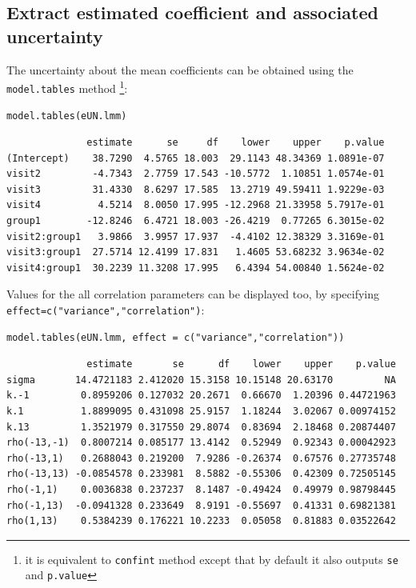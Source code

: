\documentclass[12pt]{article}
\begin{document}
\subsection{Extract estimated coefficient and associated uncertainty}
\label{sec:orged2e9f9}

The uncertainty about the mean coefficients can be obtained using the
\texttt{model.tables} method \footnote{it is equivalent to \texttt{confint} method
except that by default it also outputs \texttt{se} and \texttt{p.value}}:
\lstset{language=r,label= ,caption= ,captionpos=b,numbers=none}
\begin{lstlisting}
model.tables(eUN.lmm)
\end{lstlisting}

\begin{verbatim}
              estimate      se     df    lower    upper    p.value
(Intercept)    38.7290  4.5765 18.003  29.1143 48.34369 1.0891e-07
visit2         -4.7343  2.7759 17.543 -10.5772  1.10851 1.0574e-01
visit3         31.4330  8.6297 17.585  13.2719 49.59411 1.9229e-03
visit4          4.5214  8.0050 17.995 -12.2968 21.33958 5.7917e-01
group1        -12.8246  6.4721 18.003 -26.4219  0.77265 6.3015e-02
visit2:group1   3.9866  3.9957 17.937  -4.4102 12.38329 3.3169e-01
visit3:group1  27.5714 12.4199 17.831   1.4605 53.68232 3.9634e-02
visit4:group1  30.2239 11.3208 17.995   6.4394 54.00840 1.5624e-02
\end{verbatim}


Values for the all correlation parameters can be displayed
too, by specifying \texttt{effect=c("variance","correlation")}:
\lstset{language=r,label= ,caption= ,captionpos=b,numbers=none}
\begin{lstlisting}
model.tables(eUN.lmm, effect = c("variance","correlation"))
\end{lstlisting}

\begin{verbatim}
              estimate       se      df    lower    upper    p.value
sigma       14.4721183 2.412020 15.3158 10.15148 20.63170         NA
k.-1         0.8959206 0.127032 20.2671  0.66670  1.20396 0.44721963
k.1          1.8899095 0.431098 25.9157  1.18244  3.02067 0.00974152
k.13         1.3521979 0.317550 29.8074  0.83694  2.18468 0.20874407
rho(-13,-1)  0.8007214 0.085177 13.4142  0.52949  0.92343 0.00042923
rho(-13,1)   0.2688043 0.219200  7.9286 -0.26374  0.67576 0.27735748
rho(-13,13) -0.0854578 0.233981  8.5882 -0.55306  0.42309 0.72505145
rho(-1,1)    0.0036838 0.237237  8.1487 -0.49424  0.49979 0.98798445
rho(-1,13)  -0.0941328 0.233649  8.9191 -0.55697  0.41331 0.69821381
rho(1,13)    0.5384239 0.176221 10.2233  0.05058  0.81883 0.03522642
\end{verbatim}
\end{document}
